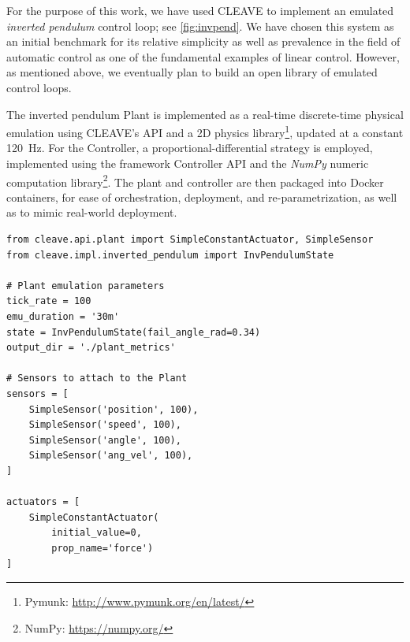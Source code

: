 For the purpose of this work, we have used \ac{CLEAVE} to implement an emulated \emph{inverted pendulum} control loop; see \cref{fig:invpend}.
We have chosen this system as an initial benchmark for its relative simplicity as well as prevalence in the field of automatic control as one of the fundamental examples of linear control.
However, as mentioned above, we eventually plan to build an open library of emulated control loops.  

The inverted pendulum Plant is implemented as a real-time discrete-time physical emulation using CLEAVE's API and a 2D physics library\footnote{Pymunk: \url{http://www.pymunk.org/en/latest/}}, updated at a constant \SI{120}{\hertz}.
For the Controller, a proportional-differential strategy is employed, implemented using the framework Controller API and the \emph{NumPy} numeric computation library\footnote{NumPy: \url{https://numpy.org/}}.
The plant and controller are then packaged into Docker containers, for ease of orchestration, deployment, and re-parametrization, as well as to mimic real-world deployment.

\begin{listing}
    \begin{verbatim}
from cleave.api.plant import SimpleConstantActuator, SimpleSensor
from cleave.impl.inverted_pendulum import InvPendulumState

# Plant emulation parameters
tick_rate = 100
emu_duration = '30m'
state = InvPendulumState(fail_angle_rad=0.34)
output_dir = './plant_metrics'

# Sensors to attach to the Plant
sensors = [
    SimpleSensor('position', 100),
    SimpleSensor('speed', 100),
    SimpleSensor('angle', 100),
    SimpleSensor('ang_vel', 100),
]

actuators = [
    SimpleConstantActuator(
        initial_value=0,
        prop_name='force')
]
    \end{verbatim}
    \caption{
        Example configuration file for a \ac{CLEAVE} Plant, defining the parameters for a single emulation.
    }
    \label{lst:config:plant}
\end{listing}